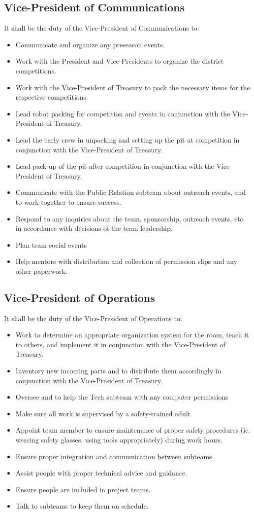 \documentclass[12pt, a4paper]{article}
\begin{document}
\subsection{Vice-President of Communications}
It shall be the duty of the Vice-President of Communications to:
\begin{itemize}
\item Communicate and organize any preseason events.
\item Work with the President and Vice-Presidents to organize the district competitions.
\item Work with the Vice-President of Treasury to pack the necessary items for the respective competitions.
\item Lead robot packing for competition and events in conjunction with the Vice-President of Treasury.
\item Lead the early crew in unpacking and setting up the pit at competition in conjunction with the Vice-President of Treasury.
\item Lead pack-up of the pit after competition in conjunction with the Vice-President of Treasury.
\item Communicate with the Public Relation subteam about outreach events, and to work together to ensure success.
\item Respond to any inquiries about the team, sponsorship, outreach events, etc. in accordance with decisions of the team leadership.
\item Plan team social events
\item Help mentors with distribution and collection of permission slips and any other paperwork.
\end{itemize}
\subsection{Vice-President of Operations}
It shall be the duty of the Vice-President of Operations to:
\begin{itemize}
\item Work to determine an appropriate organization system for the room, teach it to others, and implement it in conjunction with the Vice-President of Treasury.
\item Inventory new incoming parts and to distribute them accordingly in conjunction with the Vice-President of Treasury.
\item Oversee and to help the Tech subteam with any computer permissions
\item Make sure all work is supervised by a safety-trained adult
\item Appoint team member to ensure maintenance of proper safety procedures (ie. wearing safety glasses, using tools appropriately) during work hours.
\item Ensure proper integration and communication between subteams
\item Assist people with proper technical advice and guidance.
\item Ensure people are included in project teams.
\item Talk to subteams to keep them on schedule.
\end{itemize}
\end{document}
